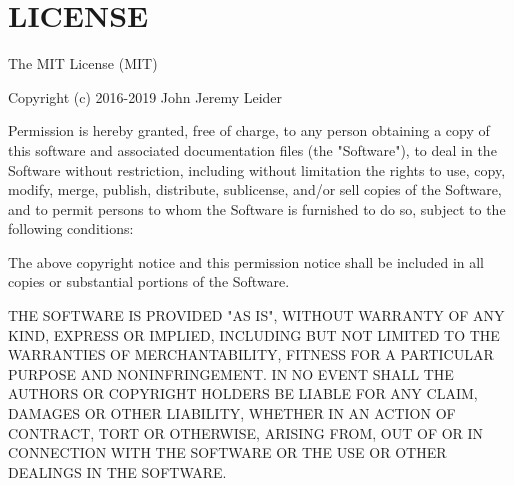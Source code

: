\chapter{LICENSE}
\hypertarget{md__c_1_2_users_2alexs_2source_2repos_2_s_q_8_term_project_8my_weather_2_s_q_8_term_project_8my_e2f4d35c28dc29917684fc51f152afb8}{}\label{md__c_1_2_users_2alexs_2source_2repos_2_s_q_8_term_project_8my_weather_2_s_q_8_term_project_8my_e2f4d35c28dc29917684fc51f152afb8}
The MIT License (MIT)

Copyright (c) 2016-\/2019 John Jeremy Leider

Permission is hereby granted, free of charge, to any person obtaining a copy of this software and associated documentation files (the "{}\+Software"{}), to deal in the Software without restriction, including without limitation the rights to use, copy, modify, merge, publish, distribute, sublicense, and/or sell copies of the Software, and to permit persons to whom the Software is furnished to do so, subject to the following conditions\+:

The above copyright notice and this permission notice shall be included in all copies or substantial portions of the Software.

THE SOFTWARE IS PROVIDED "{}\+AS IS"{}, WITHOUT WARRANTY OF ANY KIND, EXPRESS OR IMPLIED, INCLUDING BUT NOT LIMITED TO THE WARRANTIES OF MERCHANTABILITY, FITNESS FOR A PARTICULAR PURPOSE AND NONINFRINGEMENT. IN NO EVENT SHALL THE AUTHORS OR COPYRIGHT HOLDERS BE LIABLE FOR ANY CLAIM, DAMAGES OR OTHER LIABILITY, WHETHER IN AN ACTION OF CONTRACT, TORT OR OTHERWISE, ARISING FROM, OUT OF OR IN CONNECTION WITH THE SOFTWARE OR THE USE OR OTHER DEALINGS IN THE SOFTWARE. 